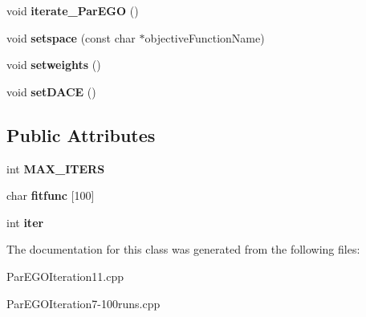 \begin{DoxyCompactItemize}
\item 
\hypertarget{classuniverse_a0b52db1da3e7f8f43a8946cbb87390d0}{}void {\bfseries iterate\+\_\+\+Par\+E\+G\+O} ()\label{classuniverse_a0b52db1da3e7f8f43a8946cbb87390d0}

\item 
\hypertarget{classuniverse_a2bd3a92e07682c895e8143442f7f6419}{}void {\bfseries setspace} (const char $\ast$objective\+Function\+Name)\label{classuniverse_a2bd3a92e07682c895e8143442f7f6419}

\item 
\hypertarget{classuniverse_a5f97f94ebddc20321623d15d8ebcee26}{}void {\bfseries setweights} ()\label{classuniverse_a5f97f94ebddc20321623d15d8ebcee26}

\item 
\hypertarget{classuniverse_a7c14a7e92304b7acdb54d08d7a49d6c9}{}void {\bfseries set\+D\+A\+C\+E} ()\label{classuniverse_a7c14a7e92304b7acdb54d08d7a49d6c9}

\end{DoxyCompactItemize}
\subsection*{Public Attributes}
\begin{DoxyCompactItemize}
\item 
\hypertarget{classuniverse_ab46b989282304e7dc045d239a11fdcdb}{}int {\bfseries M\+A\+X\+\_\+\+I\+T\+E\+R\+S}\label{classuniverse_ab46b989282304e7dc045d239a11fdcdb}

\item 
\hypertarget{classuniverse_a4d3089d19bfae177792cfa61ec226866}{}char {\bfseries fitfunc} \mbox{[}100\mbox{]}\label{classuniverse_a4d3089d19bfae177792cfa61ec226866}

\item 
\hypertarget{classuniverse_ae452e2fc18598915cda22ab1288fe168}{}int {\bfseries iter}\label{classuniverse_ae452e2fc18598915cda22ab1288fe168}

\end{DoxyCompactItemize}


The documentation for this class was generated from the following files\+:\begin{DoxyCompactItemize}
\item 
Par\+E\+G\+O\+Iteration11.\+cpp\item 
Par\+E\+G\+O\+Iteration7-\/100runs.\+cpp\end{DoxyCompactItemize}
